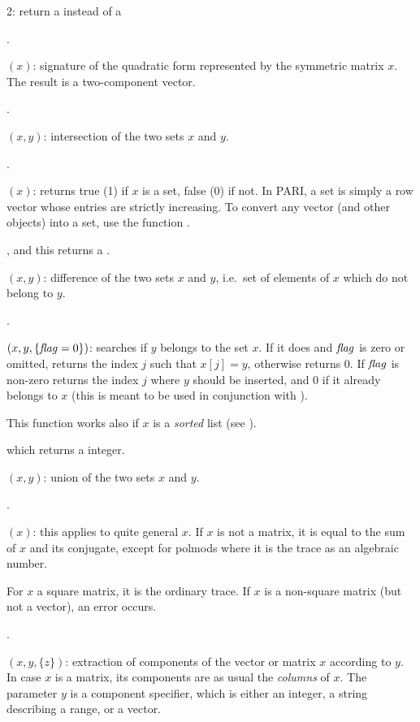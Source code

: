 \item 2: return a  instead of a 

.

$(x)$: signature of the quadratic form represented by the
symmetric matrix $x$. The result is a two-component vector.

.

$(x,y)$: intersection of the two sets $x$ and $y$.

.

$(x)$: returns true (1) if $x$ is a set, false (0) if
not. In PARI, a set is simply a row vector whose entries are strictly
increasing. To convert any vector (and other objects) into a set, use the
function .

, and this returns a .

$(x,y)$: difference of the two sets $x$ and $y$,
i.e.~set of elements of $x$ which do not belong to $y$.

.

$(x,y,\{\hbox{\it f\kern0pt lag\/}=0\})$: searches if $y$ belongs to the set
$x$. If it does and $\hbox{\it f\kern0pt lag\/}$ is zero or omitted, returns the index $j$ such that
$x[j]=y$, otherwise returns 0. If $\hbox{\it f\kern0pt lag\/}$ is non-zero returns the index $j$
where $y$ should be inserted, and $0$ if it already belongs to $x$ (this is
meant to be used in conjunction with ).

This function works also if $x$ is a \emph{sorted} list (see ).

 which returns a 
integer.

$(x,y)$: union of the two sets $x$ and $y$.

.

$(x)$: this applies to quite general $x$. If $x$ is not a
matrix, it is equal to the sum of $x$ and its conjugate, except for polmods
where it is the trace as an algebraic number.

For $x$ a square matrix, it is the ordinary trace. If $x$ is a
non-square matrix (but not a vector), an error occurs.

.

$(x,y,\{z\})$: extraction of components of the
vector or matrix $x$ according to $y$. In case $x$ is a matrix, its
components are as usual the \emph{columns} of $x$. The parameter $y$ is a
component specifier, which is either an integer, a string describing a
range, or a vector.

